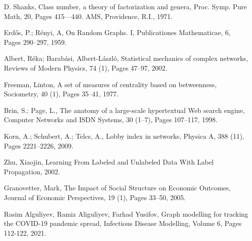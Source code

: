 \documentclass[12pt]{report}
\begin{document}
\begin{thebibliography}{9}

	D. Shanks,
	Class number, a theory of factorization and genera,
	Proc. Symp. Pure Math,
	20,
	Pages 415—440.
	AMS, Providence, R.I.,
	1971.

	Erdős, P.; Rényi, A,
	On Random Graphs. I,
	Publicationes Mathematicae,
	6,
	Pages 290–297,
	1959.

	Albert, Réka; Barabási, Albert-László,
	Statistical mechanics of complex networks,
	Reviews of Modern Physics,
	74 (1),
	Pages 47–97,
	2002.

	Freeman, Linton,
	A set of measures of centrality based on betweenness,
	Sociometry,
	40 (1),
	Pages 35–41,
	1977.

	Brin, S.; Page, L.,
	The anatomy of a large-scale hypertextual Web search engine,
	Computer Networks and ISDN Systems,
	30 (1–7),
	Pages 107–117,
	1998.

	Korn, A.; Schubert, A.; Telcs, A.,
	Lobby index in networks,
	Physica A,
	388 (11),
	Pages 2221–2226,
	2009.

	Zhu, Xiaojin,
	Learning From Labeled and Unlabeled Data With Label Propagation,
	2002.

	Granovetter, Mark,
	The Impact of Social Structure on Economic Outcomes,
	Journal of Economic Perspectives,
	19 (1),
	Pages 33–50,
	2005.

	Rasim Alguliyev, Ramiz Aliguliyev, Farhad Yusifov,
	Graph modelling for tracking the COVID-19 pandemic spread,
	Infectious Disease Modelling,
	Volume 6,
	Pages 112-122,
	2021.

\end{thebibliography}
\end{document}
